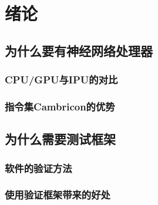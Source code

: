 ﻿\chapter{绪论}

\section{为什么要有神经网络处理器}

\subsection{CPU/GPU与IPU的对比}

\subsection{指令集Cambricon的优势}

\section{为什么需要测试框架}

\subsection{软件的验证方法}

\subsection{使用验证框架带来的好处}